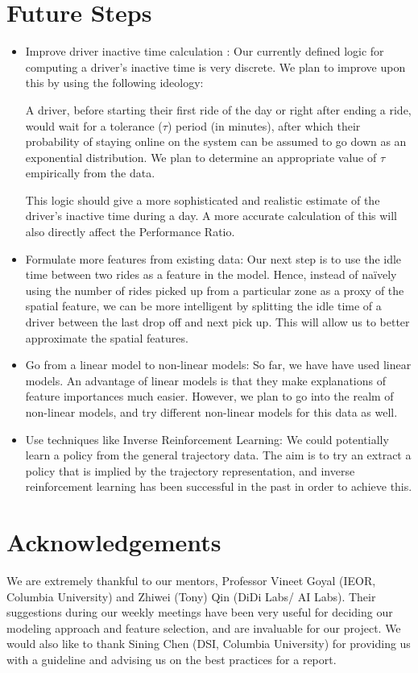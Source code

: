 \documentclass[11pt]{article}
\begin{document}
\section{Future Steps}
\begin{itemize}
    \item Improve driver inactive time calculation :
    Our currently defined logic for computing a driver's inactive time is very discrete. We plan to improve upon this by using the following ideology: 
    
    A driver, before starting their first ride of the day or right after ending a ride, would wait for a tolerance ($\tau$) period (in minutes), after which their probability of staying online on the system can be assumed to go down as an exponential distribution. We plan to determine an appropriate value of $\tau$ empirically from the data.
    
    This logic should give a more sophisticated and realistic estimate of the driver's inactive time during a day. A more accurate calculation of this will also directly affect the Performance Ratio.

    \item Formulate more features from existing data:
    Our next step is to use the idle time between two rides as a feature in the model. Hence, instead of na\"ively using the number of rides picked up from a particular zone as a proxy of the spatial feature, we can be more intelligent by splitting the idle time of a driver between the last drop off and next pick up. This will allow us to better approximate the spatial features.
    \item Go from a linear model to non-linear models:
    So far, we have have used linear models. An advantage of linear models is that they make explanations of feature importances much easier. However, we plan to go into the realm of non-linear models, and try different non-linear models for this data as well.
    \item Use techniques like Inverse Reinforcement Learning: We could potentially learn a policy from the general trajectory data. The aim is to try an extract a policy that is implied by the trajectory representation, and inverse reinforcement learning has been successful in the past in order to achieve this.
\end{itemize}


\section{Acknowledgements}
We are extremely thankful to our mentors, Professor Vineet Goyal (IEOR, Columbia University) and Zhiwei (Tony) Qin (DiDi Labs/ AI Labs). Their suggestions during our weekly meetings have been very useful for deciding our modeling approach and feature selection, and are invaluable for our project. We would also like to thank Sining Chen (DSI, Columbia University) for providing us with a guideline and advising us on the best practices for a report. 
\end{document}
